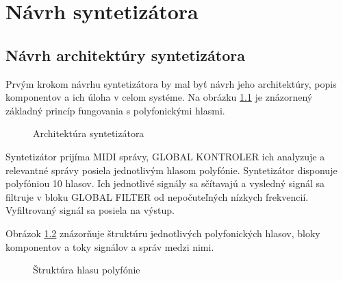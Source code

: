 \chapter{Návrh syntetizátora}
\section{Návrh architektúry syntetizátora}

Prvým krokom návrhu syntetizátora by mal byť návrh jeho architektúry, popis komponentov a ich úloha v celom systéme. Na obrázku \ref{obr06a} je znázornený základný princíp fungovania s polyfonickými hlasmi.

\begin{figure}[h]
\centering
{}
\caption{\label{obr06a} Architektúra syntetizátora}
\end{figure}

Syntetizátor prijíma MIDI správy, GLOBAL KONTROLER ich analyzuje a relevantné správy posiela jednotlivým hlasom polyfónie. Syntetizátor disponuje polyfóniou 10 hlasov. Ich jednotlivé signály sa sčítavajú a vysledný signál sa filtruje v bloku GLOBAL FILTER od nepočuteľných nízkych frekvencií. Vyfiltrovaný signál sa posiela na výstup.

Obrázok \ref{obr06b} znázorňuje štruktúru jednotlivých polyfonických hlasov, bloky komponentov a toky signálov a správ medzi nimi. 

\begin{figure}[h]
\centering
{}
\caption{\label{obr06b} Štruktúra hlasu polyfónie}
\end{figure}

